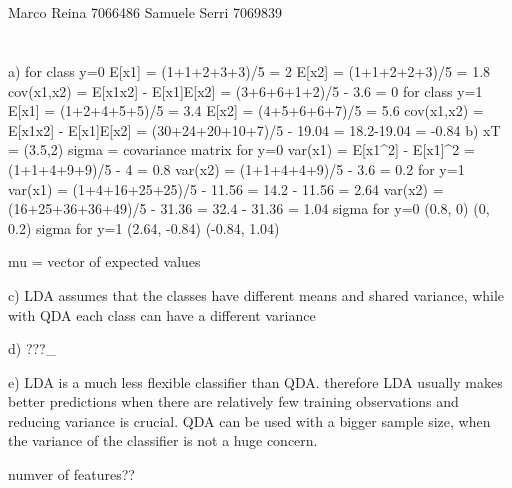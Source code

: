 \documentclass[12pt]{article}
\begin{document}
\section*{}
Marco Reina 7066486 \newline
Samuele Serri 7069839 \newline
\section*{}
a)
for class y=0
E[x1] = (1+1+2+3+3)/5 = 2
E[x2] = (1+1+2+2+3)/5 = 1.8
cov(x1,x2) = E[x1x2] - E[x1]E[x2] = (3+6+6+1+2)/5 - 3.6 = 0
for class y=1
E[x1] = (1+2+4+5+5)/5 = 3.4
E[x2] = (4+5+6+6+7)/5 = 5.6
cov(x1,x2) = E[x1x2] - E[x1]E[x2] = (30+24+20+10+7)/5 - 19.04 = 18.2-19.04 = -0.84
b)
xT = (3.5,2)
sigma = covariance matrix
for y=0
var(x1) = E[x1^2] - E[x1]^2 = (1+1+4+9+9)/5 - 4 = 0.8
var(x2) = (1+1+4+4+9)/5 - 3.6 = 0.2
for y=1
var(x1) = (1+4+16+25+25)/5 - 11.56 = 14.2 - 11.56 = 2.64
var(x2) = (16+25+36+36+49)/5 - 31.36 = 32.4 - 31.36 = 1.04
sigma for y=0
(0.8, 0)
(0, 0.2)
sigma for y=1
(2.64, -0.84)
(-0.84, 1.04)

mu = vector of expected values

c)
LDA assumes that the classes have different means and shared variance,
while with QDA each class can have a different variance

d)
???_

e)
LDA is a much less flexible classifier than QDA.
therefore LDA usually makes better predictions when there are
relatively few training observations and reducing variance is crucial.
QDA can be used with a bigger sample size, when the variance of the
classifier is not a huge concern.

numver of features??
\end{document}
